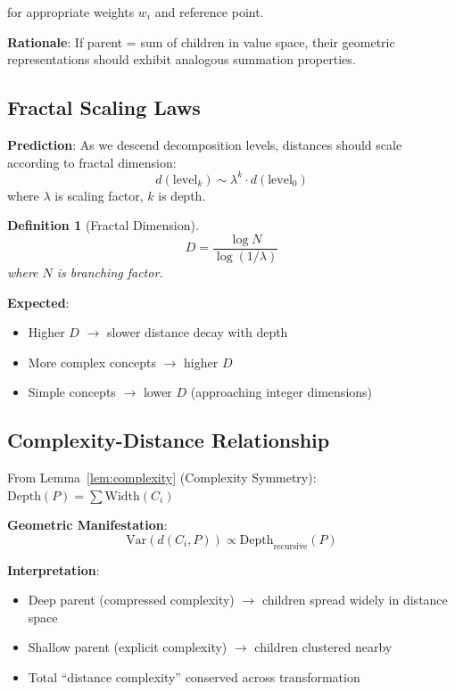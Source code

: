 \documentclass[11pt,a4paper]{article}
\newtheorem{definition}{Definition}
\begin{document}
for appropriate weights $w_i$ and reference point.

\textbf{Rationale}: If parent = sum of children in value space, their geometric representations should exhibit analogous summation properties.

\subsection{Fractal Scaling Laws}

\textbf{Prediction}: As we descend decomposition levels, distances should scale according to fractal dimension:
\begin{equation}
d(\text{level}_k) \sim \lambda^k \cdot d(\text{level}_0)
\end{equation}
where $\lambda$ is scaling factor, $k$ is depth.

\begin{definition}[Fractal Dimension]
\begin{equation}
D = \frac{\log N}{\log(1/\lambda)}
\end{equation}
where $N$ is branching factor.
\end{definition}

\textbf{Expected}:
\begin{itemize}
    \item Higher $D$ $\to$ slower distance decay with depth
    \item More complex concepts $\to$ higher $D$
    \item Simple concepts $\to$ lower $D$ (approaching integer dimensions)
\end{itemize}

\subsection{Complexity-Distance Relationship}

From Lemma~\ref{lem:complexity} (Complexity Symmetry): $\text{Depth}(P) = \sum \text{Width}(C_i)$

\textbf{Geometric Manifestation}:
\begin{equation}
\text{Var}(d(C_i, P)) \propto \text{Depth}_{\text{recursive}}(P)
\end{equation}

\textbf{Interpretation}:
\begin{itemize}
    \item Deep parent (compressed complexity) $\to$ children spread widely in distance space
    \item Shallow parent (explicit complexity) $\to$ children clustered nearby
    \item Total ``distance complexity'' conserved across transformation
\end{itemize}
\end{document}
